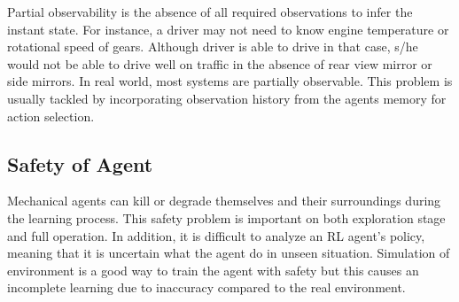 Partial observability is the absence of all required observations to infer the instant state. 
For instance, a driver may not need to know engine temperature or rotational speed of gears. 
Although driver is able to drive in that case, s/he would not be able to drive well on traffic in the absence of rear view mirror or side mirrors. 
In real world, most systems are partially observable. 
This problem is usually tackled by incorporating observation history from the agents memory for action selection. 

\subsection{Safety of Agent}

Mechanical agents can kill or degrade themselves and their surroundings during the learning process. 
This safety problem is important on both exploration stage and full operation. 
In addition, it is difficult to analyze an RL agent's policy, meaning that it is uncertain what the agent do in unseen situation. 
Simulation of environment is a good way to train the agent with safety but this causes an incomplete learning due to inaccuracy compared to the real environment. 

